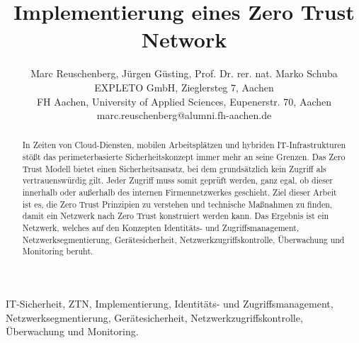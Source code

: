 \documentclass[lettersize,journal]{IEEEtran}
\begin{document}
\title{Implementierung eines Zero Trust Network}
\author{
	Marc Reuschenberg, Jürgen Güsting, Prof. Dr. rer. nat. Marko Schuba\\
	EXPLETO GmbH, Zieglersteg 7, Aachen \\
	FH Aachen, University of Applied Sciences, Eupenerstr. 70, Aachen\\
	marc.reuschenberg@alumni.fh-aachen.de
}
{}

\maketitle

\begin{abstract}
In Zeiten von Cloud-Diensten, mobilen Arbeitsplätzen und hybriden IT-Infrastrukturen stößt das perimeterbasierte Sicherheitskonzept immer mehr an seine Grenzen. Das Zero Trust Modell bietet einen  Sicherheitsansatz, bei dem grundsätzlich kein Zugriff als vertrauenswürdig gilt. Jeder Zugriff muss somit geprüft werden, ganz egal, ob dieser innerhalb oder außerhalb des internen Firmennetzwerkes geschieht. Ziel dieser Arbeit ist es, die Zero Trust Prinzipien zu verstehen und technische Maßnahmen zu finden, damit ein Netzwerk nach Zero Trust konstruiert werden kann. Das Ergebnis ist ein Netzwerk, welches auf den Konzepten Identitäts- und Zugriffsmanagement, Netzwerksegmentierung, Gerätesicherheit, Netzwerkzugriffskontrolle, Überwachung und Monitoring beruht.
\end{abstract}
\begin{IEEEkeywords}
	IT-Sicherheit, ZTN, Implementierung, Identitäts- und Zugriffsmanagement, Netzwerksegmentierung, Gerätesicherheit, Netzwerkzugriffskontrolle, Überwachung und Monitoring.
\end{IEEEkeywords}
\end{document}

